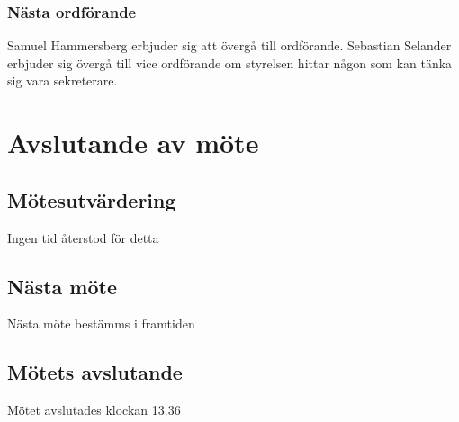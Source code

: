 \documentclass[protokoll]{dvd}
\begin{document}
\subsubsection{Nästa ordförande}

Samuel Hammersberg erbjuder sig att övergå till ordförande. Sebastian Selander erbjuder sig övergå till vice ordförande om styrelsen hittar någon som kan tänka sig vara sekreterare.

\newpage






\section{Avslutande av möte}

\subsection{Mötesutvärdering}
    Ingen tid återstod för detta

\subsection{Nästa möte}
    Nästa möte bestämms i framtiden

\subsection{Mötets avslutande}

Mötet avslutades klockan 13.36

\styrelsesignaturer
\end{document}
